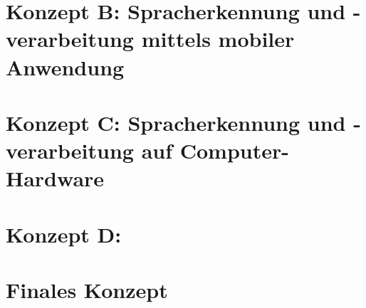 \section{Konzept B: Spracherkennung und -verarbeitung mittels mobiler Anwendung}
\section{Konzept C: Spracherkennung und -verarbeitung auf Computer-Hardware}
\section{Konzept D:}
\section{Finales Konzept}
\endinput



